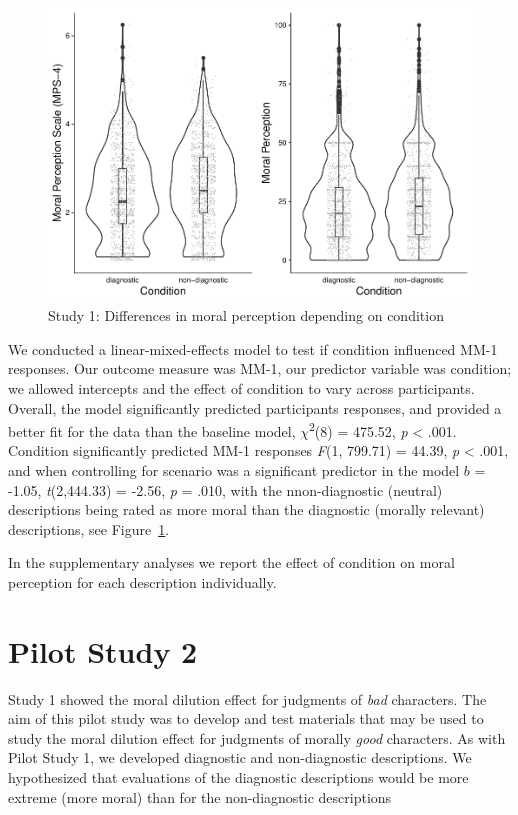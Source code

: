 \documentclass[
  american,
  man,floatsintext]{apa7}
\begin{document}
\begin{figure}
\centering
\includegraphics{moral_dilution_in_chunks_files/figure-latex/S1bothconditionplot-1.pdf}
\caption{\label{fig:S1bothconditionplot}Study 1: Differences in moral perception depending on condition}
\end{figure}

We conducted a linear-mixed-effects model to test if condition influenced MM-1 responses. Our outcome measure was MM-1, our predictor variable was condition; we allowed intercepts and the effect of condition to vary across participants. Overall, the model significantly predicted participants responses, and provided a better fit for the data than the baseline model, \(\chi\)\textsuperscript{2}(8) = 475.52, \emph{p} \textless{} .001. Condition significantly predicted MM-1 responses \emph{F}(1, 799.71) = 44.39, \emph{p} \textless{} .001, and when controlling for scenario was a significant predictor in the model \(b\) = -1.05, \emph{t}(2,444.33) = -2.56, \emph{p} = .010, with the nnon-diagnostic (neutral) descriptions being rated as more moral than the diagnostic (morally relevant) descriptions, see Figure~\ref{fig:S1bothconditionplot}.

In the supplementary analyses we report the effect of condition on moral perception for each description individually.

\hypertarget{pilot-study-2}{%
\section{Pilot Study 2}\label{pilot-study-2}}

Study 1 showed the moral dilution effect for judgments of \emph{bad} characters. The aim of this pilot study was to develop and test materials that may be used to study the moral dilution effect for judgments of morally \emph{good} characters. As with Pilot Study 1, we developed diagnostic and non-diagnostic descriptions. We hypothesized that evaluations of the diagnostic descriptions would be more extreme (more moral) than for the non-diagnostic descriptions
\end{document}
